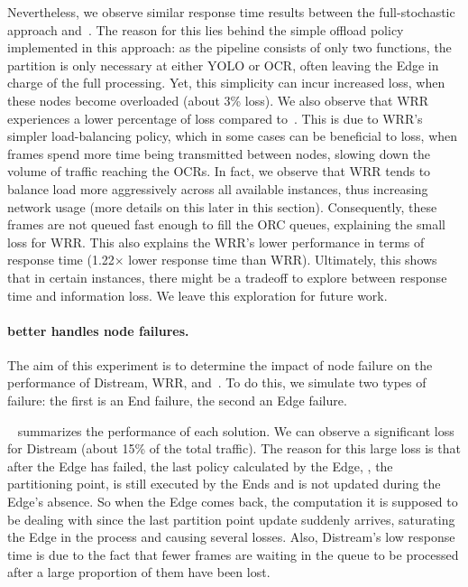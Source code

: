 Nevertheless, we observe similar response time results between the full-stochastic approach and~\videojam{}. The reason for this lies behind the simple offload policy implemented in this approach: as the pipeline consists of only two functions, the partition is only necessary at either YOLO or OCR, often leaving the Edge in charge of the full processing. Yet, this simplicity can incur increased loss, when these nodes become overloaded (about 3\% loss). We also observe that WRR experiences a lower percentage of loss compared to~\videojam{}. This is due to WRR's simpler load-balancing policy, which in some cases can be beneficial to loss, when frames spend more time being transmitted between nodes, slowing down the volume of traffic reaching the OCRs. In fact, we observe that WRR tends to balance load more aggressively across all available instances, thus increasing network usage (more details on this later in this section). Consequently, these frames are not queued fast enough to fill the ORC queues, explaining the small loss for WRR. This also explains the WRR's lower performance in terms of response time (1.22$\times$ lower response time than WRR). Ultimately, this shows that in certain instances, there might be a tradeoff to explore between response time and information loss. We leave this exploration for future work.



\paragraph{\videojam{} better handles node failures.} The aim of this experiment is to determine the impact of node failure on the performance of Distream, WRR, and~\videojam{}. To do this, we simulate two types of failure: the first is an End failure, the second an Edge failure.

~ summarizes the performance of each solution. We can observe a significant loss for Distream (about 15\% of the total traffic). The reason for this large loss is that after the Edge has failed, the last policy calculated by the Edge, \ie, the partitioning point, is still executed by the Ends and is not updated during the Edge's absence. So when the Edge comes back, the computation it is supposed to be dealing with since the last partition point update suddenly arrives, saturating the Edge in the process and causing several losses. Also, Distream's low response time is due to the fact that fewer frames are waiting in the queue to be processed after a large proportion of them have been lost.

